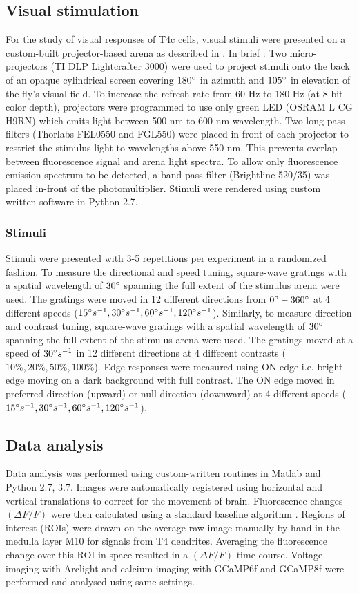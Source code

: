 \documentclass[9pt,lineno]{elife}
\begin{document}
\subsection{Visual stimulation}
For the study of visual responses of T4c cells, visual stimuli were presented on a custom-built projector-based arena as described in \parencite{Arenz2017}. In brief : Two micro-projectors (TI DLP Lightcrafter 3000) were used to project stimuli onto the back of an opaque cylindrical screen covering $180\degree$ in azimuth and $105\degree$ in elevation of the fly's visual field. To increase the refresh rate from 60 Hz to 180 Hz (at 8 bit color depth), projectors were programmed to use only green LED (OSRAM L CG H9RN) which emits light between 500 nm to 600 nm wavelength. Two long-pass filters (Thorlabs FEL0550 and FGL550) were placed in front of each projector to restrict the stimulus light to wavelengths above 550 nm. This prevents overlap between fluorescence signal and arena light spectra. To allow only fluorescence emission spectrum to be detected, a band-pass filter (Brightline 520/35) was placed in-front of the photomultiplier. Stimuli were rendered using custom written software in Python 2.7. 

\subsubsection{Stimuli}
Stimuli were presented with 3-5 repetitions per experiment in a randomized fashion. To measure the directional and speed tuning, square-wave gratings with a spatial wavelength of $30\degree$ spanning the full extent of the stimulus arena were used. The gratings were moved in 12 different directions from $0\degree - 360\degree$ at 4 different speeds ($15\degree s^{-1},30\degree s^{-1},60\degree s^{-1},120\degree s^{-1}$). Similarly, to measure direction and contrast tuning, square-wave gratings with a spatial wavelength of $30\degree$ spanning the full extent of the stimulus arena were used. The gratings moved at a speed of $30\degree s^{-1}$ in 12 different directions at 4 different contrasts ($10\%, 20\%, 50\%, 100\%$). Edge responses were measured using ON edge i.e. bright edge moving on a dark background with full contrast. The ON edge moved in preferred direction (upward) or null direction (downward) at 4 different speeds ($15\degree s^{-1},30\degree s^{-1},60\degree s^{-1},120\degree s^{-1}$).

\subsection{Data analysis}
Data analysis was performed using custom-written routines in Matlab and Python 2.7, 3.7. Images were automatically registered using horizontal and vertical translations to correct for the movement of brain. Fluorescence changes $(\Delta F/F)$ were then calculated using a standard baseline algorithm \parencite{Jia2011}. Regions of interest (ROIs) were drawn on the average raw image manually by hand in the medulla layer M10 for signals from T4 dendrites. Averaging the fluorescence change over this ROI in space resulted in a $(\Delta F/F)$ time course. Voltage imaging with Arclight and calcium imaging with GCaMP6f and GCaMP8f were performed and analysed using same settings.
\end{document}
